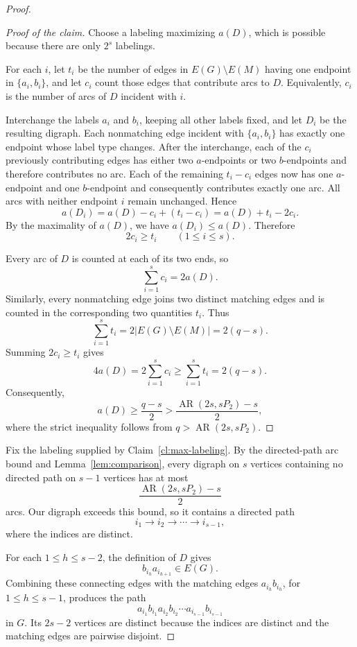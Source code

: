 \documentclass[10pt,a4paper]{article}
\DeclareMathOperator{\AR}{AR}
\begin{document}
\begin{proof}
	\begin{proof}[Proof of the claim]
		Choose a labeling maximizing $a(D)$, which is possible
		because there are only $2^s$ labelings.
		
		For each $i$, let $t_i$ be the number of edges in
		$E(G)\setminus E(M)$ having one endpoint in
		$\{a_i,b_i\}$, and let $c_i$ count those edges that
		contribute arcs to $D$.
		Equivalently, $c_i$ is the number of arcs of $D$
		incident with $i$.
		
		Interchange the labels $a_i$ and $b_i$, keeping all
		other labels fixed, and let $D_i$ be the resulting
		digraph. Each nonmatching edge incident with
		$\{a_i,b_i\}$ has exactly one endpoint whose label
		type changes. After the interchange, each of the $c_i$ previously
		contributing edges has either two $a$-endpoints or two
		$b$-endpoints and therefore contributes no arc.
		Each of the remaining $t_i-c_i$ edges now has one
		$a$-endpoint and one $b$-endpoint and consequently
		contributes exactly one arc.
		All arcs with neither endpoint $i$ remain unchanged.
		Hence
		\[
		a(D_i)=a(D)-c_i+(t_i-c_i)
		=a(D)+t_i-2c_i.
		\]
		By the maximality of $a(D)$, we have $a(D_i)\le a(D)$.
		Therefore
		\[
		2c_i\ge t_i
		\qquad (1\le i\le s).
		\]
		
		Every arc of $D$ is counted at each of its two ends,
		so 
		\[\sum_{i=1}^s c_i=2a(D).\]
		Similarly, every nonmatching edge joins two distinct
		matching edges and is counted in the corresponding
		two quantities $t_i$. Thus
		\[
		\sum_{i=1}^s t_i
		=2|E(G)\setminus E(M)|
		=2(q-s).
		\]
		Summing $2c_i\ge t_i$ gives
		\[
		4a(D)
		=2\sum_{i=1}^s c_i
		\ge\sum_{i=1}^s t_i
		=2(q-s).
		\]
		Consequently,
		\[
		a(D)\ge\frac{q-s}{2}
		>\frac{\AR(2s,sP_2)-s}{2},
		\]
		where the strict inequality follows from
		$q>\AR(2s,sP_2)$.
	\end{proof}
	
	Fix the labeling supplied by Claim~\ref{cl:max-labeling}.
	By the directed-path arc bound and
	Lemma~\ref{lem:comparison}, every digraph on $s$ vertices
	containing no directed path on $s-1$ vertices has at most
	\[
	\frac{\AR(2s,sP_2)-s}{2}
	\]
	arcs. Our digraph exceeds this bound, so it contains
	a directed path
	\[
	i_1\to i_2\to\cdots\to i_{s-1},
	\]
	where the indices are distinct.
	
	For each $1\le h\le s-2$, the definition of $D$ gives
	\[
	b_{i_h}a_{i_{h+1}}\in E(G).
	\]
	Combining these connecting edges with the matching
	edges $a_{i_h}b_{i_h}$, for $1\le h\le s-1$, produces
	the path
	\[
	a_{i_1}b_{i_1}a_{i_2}b_{i_2}\cdots
	a_{i_{s-1}}b_{i_{s-1}}
	\]
	in $G$. Its $2s-2$ vertices are distinct because
	the indices are distinct and the matching edges
	are pairwise disjoint.
	

\end{proof}
\end{document}
